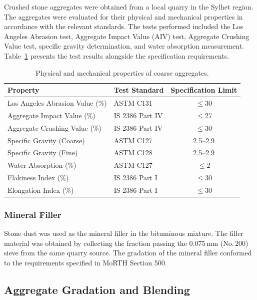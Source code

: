 \documentclass[12pt,a4paper]{article}
\begin{document}
Crushed stone aggregates were obtained from a local quarry in the Sylhet region. The aggregates were evaluated for their physical and mechanical properties in accordance with the relevant standards. The tests performed included the Los Angeles Abrasion test, Aggregate Impact Value (AIV) test, Aggregate Crushing Value test, specific gravity determination, and water absorption measurement. Table~\ref{tab:agg_properties} presents the test results alongside the specification requirements.

\begin{table}[htbp]
    \centering
    \caption{Physical and mechanical properties of coarse aggregates.}
    \label{tab:agg_properties}
    \begin{tabular}{@{}llc@{}}
        \toprule
        \textbf{Property} & \textbf{Test Standard} & \textbf{Specification Limit} \\
        \midrule
        Los Angeles Abrasion Value (\%) & ASTM C131 & $\leq$30 \\
        Aggregate Impact Value (\%) & IS 2386 Part IV & $\leq$27 \\
        Aggregate Crushing Value (\%) & IS 2386 Part IV & $\leq$30 \\
        Specific Gravity (Coarse) & ASTM C127 & 2.5--2.9 \\
        Specific Gravity (Fine) & ASTM C128 & 2.5--2.9 \\
        Water Absorption (\%) & ASTM C127 & $\leq$2 \\
        Flakiness Index (\%) & IS 2386 Part I & $\leq$30 \\
        Elongation Index (\%) & IS 2386 Part I & $\leq$30 \\
        \bottomrule
    \end{tabular}
\end{table}

\subsubsection{Mineral Filler}

Stone dust was used as the mineral filler in the bituminous mixture. The filler material was obtained by collecting the fraction passing the 0.075\,mm (No.\,200) sieve from the same quarry source. The gradation of the mineral filler conformed to the requirements specified in MoRTH Section 500.

\subsection{Aggregate Gradation and Blending}
\label{subsec:agg_gradation}
\end{document}
